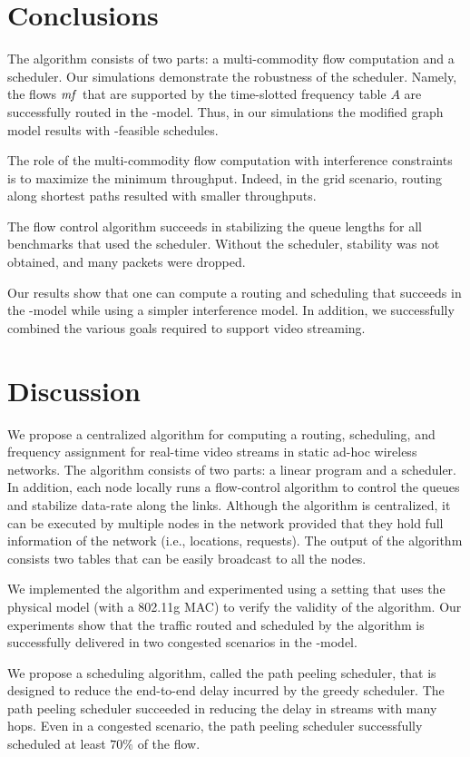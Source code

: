 \documentclass[12pt]{article}
\newenvironment{proof sketch}[1]{\noindent {\emph{Proof sketch of #1:}}}{\hfill \qed}
\newcommand{\SINR}{\text{\sc{sinr}}}
\newcommand{\mf}{\text{\emph{mf}}}
\begin{document}
\section{Conclusions}
The algorithm consists of two parts: a multi-commodity flow
computation and a scheduler.  Our simulations demonstrate the
robustness of the scheduler.  Namely, the flows $\mf$ that are
supported by the time-slotted frequency table $A$ are successfully
routed in the \SINR-model. Thus, in our simulations the modified graph
model results with \SINR-feasible schedules.

The role of the multi-commodity flow computation with interference
constraints is to maximize the minimum throughput. Indeed, in the grid
scenario, routing along shortest paths resulted with smaller
throughputs.

The flow control algorithm succeeds in stabilizing the queue lengths
for all benchmarks that used the scheduler. Without the scheduler,
stability was not obtained, and many packets were dropped.

Our results show that one can compute a routing and scheduling that
succeeds in the \SINR-model while using a simpler interference model.
In addition, we successfully combined the various goals required to
support video streaming.

\section{Discussion}
We propose a centralized algorithm for computing a routing,
scheduling, and frequency assignment for real-time video streams in
static ad-hoc wireless networks.  The algorithm consists of two parts:
a linear program and a scheduler.  In addition, each node locally runs
a flow-control algorithm to control the queues and stabilize data-rate
along the links.  Although the algorithm is centralized, it can be
executed by multiple nodes in the network provided that they hold full
information of the network (i.e., locations, requests).  The output of
the algorithm consists two tables that can be easily broadcast to all
the nodes.

We implemented the algorithm and experimented using a setting that
uses the physical model (with a 802.11g MAC) to verify the validity of
the algorithm.  Our experiments show that the traffic routed and
scheduled by the algorithm is successfully delivered in two congested
scenarios in the \SINR-model.

We propose a scheduling algorithm, called the path peeling scheduler,
that is designed to reduce the end-to-end delay incurred by the greedy
scheduler. The path peeling scheduler succeeded in reducing the delay
in streams with many hops. Even in a congested scenario, the path
peeling scheduler successfully scheduled at least $70\%$ of the flow.
\end{document}
